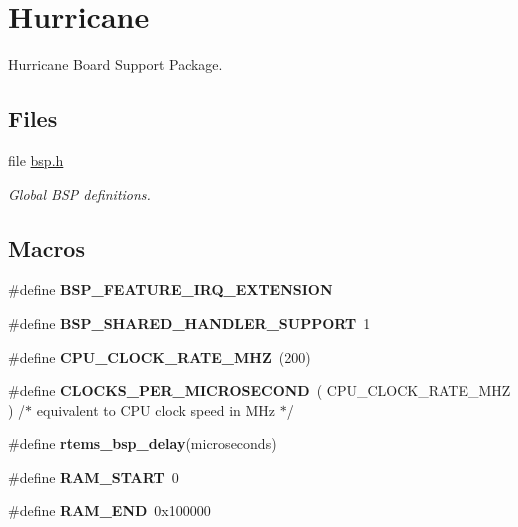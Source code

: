 \hypertarget{group__RTEMSBSPsMIPSHurricane}{}\section{Hurricane}
\label{group__RTEMSBSPsMIPSHurricane}


Hurricane Board Support Package.  


\subsection*{Files}
\begin{DoxyCompactItemize}
\item 
file \mbox{\hyperlink{bsps_2mips_2hurricane_2include_2bsp_8h}{bsp.\+h}}
\begin{DoxyCompactList}\small\item\em Global B\+SP definitions. \end{DoxyCompactList}\end{DoxyCompactItemize}
\subsection*{Macros}
\begin{DoxyCompactItemize}
\item 
\mbox{\label{group__RTEMSBSPsMIPSHurricane_ga5d7d631d3a14b7554160f14eb42f351b}} 
\#define {\bfseries B\+S\+P\+\_\+\+F\+E\+A\+T\+U\+R\+E\+\_\+\+I\+R\+Q\+\_\+\+E\+X\+T\+E\+N\+S\+I\+ON}
\item 
\mbox{\label{group__RTEMSBSPsMIPSHurricane_ga2fe5e739729e5756a04cc73da64cc8ee}} 
\#define {\bfseries B\+S\+P\+\_\+\+S\+H\+A\+R\+E\+D\+\_\+\+H\+A\+N\+D\+L\+E\+R\+\_\+\+S\+U\+P\+P\+O\+RT}~1
\item 
\mbox{\label{group__RTEMSBSPsMIPSHurricane_ga4564d30a1c11324f91d7c674afa95123}} 
\#define {\bfseries C\+P\+U\+\_\+\+C\+L\+O\+C\+K\+\_\+\+R\+A\+T\+E\+\_\+\+M\+HZ}~(200)
\item 
\mbox{\label{group__RTEMSBSPsMIPSHurricane_ga258ce7c7da13173f7b2dc74002284381}} 
\#define {\bfseries C\+L\+O\+C\+K\+S\+\_\+\+P\+E\+R\+\_\+\+M\+I\+C\+R\+O\+S\+E\+C\+O\+ND}~( C\+P\+U\+\_\+\+C\+L\+O\+C\+K\+\_\+\+R\+A\+T\+E\+\_\+\+M\+HZ ) /$\ast$ equivalent to C\+PU clock speed in M\+Hz $\ast$/
\item 
\#define {\bfseries rtems\+\_\+bsp\+\_\+delay}(microseconds)
\item 
\mbox{\label{group__RTEMSBSPsMIPSHurricane_ga2fb476d2a94e0e54f1125306010164a1}} 
\#define {\bfseries R\+A\+M\+\_\+\+S\+T\+A\+RT}~0
\item 
\mbox{\label{group__RTEMSBSPsMIPSHurricane_gacedc86555cbe508b02ba7cae729e64b1}} 
\#define {\bfseries R\+A\+M\+\_\+\+E\+ND}~0x100000
\end{DoxyCompactItemize}
